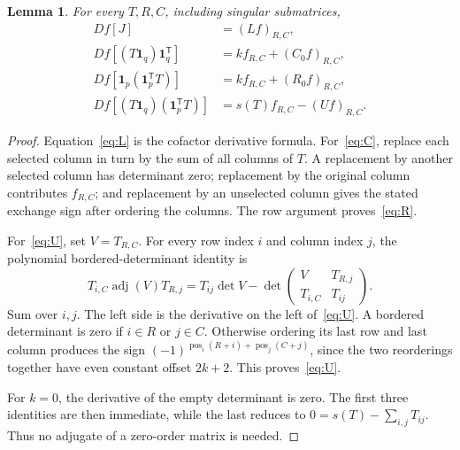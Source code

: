 \documentclass[11pt]{article}
\newtheorem{lemma}[theorem]{Lemma}
\newcommand{\pos}{\operatorname{pos}}
\newcommand{\one}{\mathbf 1}
\begin{document}
\begin{lemma}\label{lem:four}
For every $T,R,C$, including singular submatrices,
\begin{align}
 Df[J]&=(Lf)_{R,C},\label{eq:L}\\
 Df[(T\one_q)\one_q^{\mathsf T}]&=k f_{R,C}+(C_0f)_{R,C},\label{eq:C}\\
 Df[\one_p(\one_p^{\mathsf T}T)]&=k f_{R,C}+(R_0f)_{R,C},\label{eq:R}\\
 Df[(T\one_q)(\one_p^{\mathsf T}T)]&=s(T)f_{R,C}-(Uf)_{R,C}.\label{eq:U}
\end{align}
\end{lemma}
\begin{proof}
Equation~\eqref{eq:L} is the cofactor derivative formula. For~\eqref{eq:C}, replace each selected column in turn by the sum of all columns of $T$. A replacement by another selected column has determinant zero; replacement by the original column contributes $f_{R,C}$; and replacement by an unselected column gives the stated exchange sign after ordering the columns. The row argument proves~\eqref{eq:R}.

For~\eqref{eq:U}, set $V=T_{R,C}$. For every row index $i$ and column index $j$, the polynomial bordered-determinant identity is
\[
 T_{i,C}\operatorname{adj}(V)T_{R,j}
 =T_{ij}\det V-
 \det\begin{pmatrix}V&T_{R,j}\\ T_{i,C}&T_{ij}\end{pmatrix}.
\]
Sum over $i,j$. The left side is the derivative on the left of~\eqref{eq:U}. A bordered determinant is zero if $i\in R$ or $j\in C$. Otherwise ordering its last row and last column produces the sign
$(-1)^{\pos_i(R+i)+\pos_j(C+j)}$, since the two reorderings together have even constant offset $2k+2$. This proves~\eqref{eq:U}.

For $k=0$, the derivative of the empty determinant is zero. The first three identities are then immediate, while the last reduces to $0=s(T)-\sum_{i,j}T_{ij}$. Thus no adjugate of a zero-order matrix is needed.
\end{proof}
\end{document}
